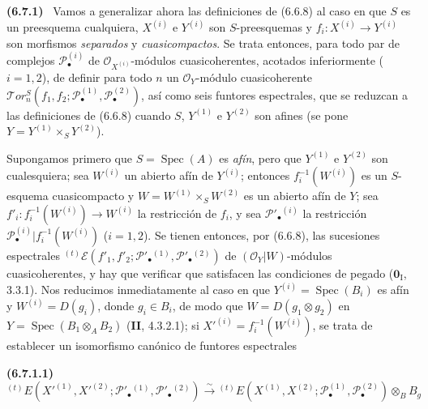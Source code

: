 \documentclass[10pt,oneside]{book}
\newcommand{\oldpage}[2][]{\setcounter{footnote}{0}\marginpar{\scriptsize\textbf{#1}~|~#2}\ignorespaces}
\newenvironment{env}[1][]{\par\medskip\noindent\textbf{(#1)}\ }{\par}
\begin{document}
\begin{env}[6.7.1]
\label{III.6.7.1}
Vamos a generalizar ahora las definiciones de (6.6.8) al caso en que $S$ es
un preesquema cualquiera, $X^{(i)}$ e $Y^{(i)}$ son $S$-preesquemas y
$f_i:X^{(i)}\to Y^{(i)}$ son morfismos \emph{separados} y \emph{cuasicompactos}. Se
trata entonces, para todo par de complejos $\mathscr P_\bullet^{(i)}$ de
$\mathscr O_{X^{(i)}}$-módulos cuasicoherentes, acotados inferiormente
($i=1,2$), de definir para todo $n$ un $\mathscr O_Y$-módulo cuasicoherente
$\mathscr T\!or_n^S
(f_1,f_2;\mathscr P_\bullet^{(1)},\mathscr P_\bullet^{(2)})$, así como seis
funtores espectrales, que se reduzcan a las definiciones de (6.6.8) cuando
$S$, $Y^{(1)}$ e $Y^{(2)}$ son afines (se pone
$Y=Y^{(1)}\times_S Y^{(2)}$).

Supongamos primero que $S=\operatorname{Spec}(A)$ es \emph{afín}, pero que
$Y^{(1)}$ e $Y^{(2)}$ son cualesquiera; sea $W^{(i)}$ un abierto afín de
$Y^{(i)}$; entonces $f_i^{-1}(W^{(i)})$ es un $S$-esquema cuasicompacto y
$W=W^{(1)}\times_S W^{(2)}$ es un abierto afín de $Y$; sea
$f'_i:f_i^{-1}(W^{(i)})\to W^{(i)}$ la restricción de $f_i$, y sea
$\mathscr P'_\bullet{}^{(i)}$ la restricción
$\mathscr P_\bullet^{(i)}|f_i^{-1}(W^{(i)})$ ($i=1,2$). Se tienen entonces,
por (6.6.8), las sucesiones espectrales
${}^{(t)}\mathscr E
(f'_1,f'_2;\mathscr P'_\bullet{}^{(1)},\mathscr P'_\bullet{}^{(2)})$
de $(\mathscr O_Y|W)$-módulos cuasicoherentes, y hay que verificar que
satisfacen las condiciones de pegado ($\mathbf{0}_{\mathrm I}$, 3.3.1).
Nos reducimos inmediatamente al caso en que
$Y^{(i)}=\operatorname{Spec}(B_i)$ es afín y $W^{(i)}=D(g_i)$, donde
$g_i\in B_i$, de modo que
$W=D(g_1\otimes g_2)$
\oldpage[III]{158}
en $Y=\operatorname{Spec}(B_1\otimes_A B_2)$ (\textbf{II}, 4.3.2.1); si
$X'^{(i)}=f_i^{-1}(W^{(i)})$, se trata de establecer un isomorfismo canónico
de funtores espectrales
\begin{env}[6.7.1.1]
\label{III.6.7.1.1}
\[
  {}^{(t)}E
  (X'^{(1)},X'^{(2)};
   \mathscr P'_\bullet{}^{(1)},\mathscr P'_\bullet{}^{(2)})
  \xrightarrow{\sim}
  {}^{(t)}E
  (X^{(1)},X^{(2)};
   \mathscr P_\bullet^{(1)},\mathscr P_\bullet^{(2)})
  \otimes_B B_g
  \tag{6.7.1.1}\label{III.6.7.1.1.eq}
\]
\end{env}


\end{env}
\end{document}
